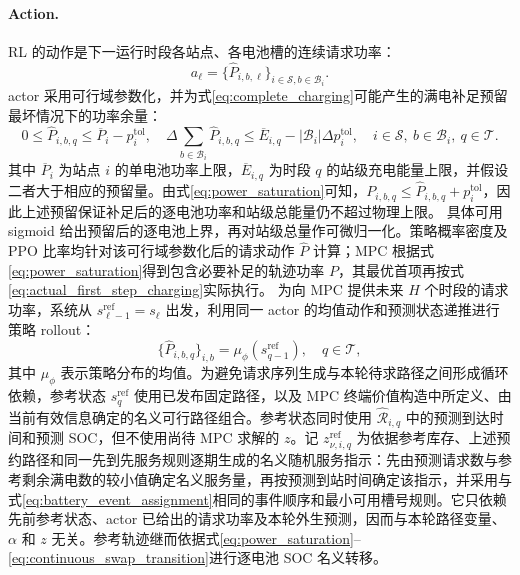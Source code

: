 \documentclass[12pt,a4paper,UTF8]{ctexart}
\begin{document}
\paragraph{Action.}
RL 的动作是下一运行时段各站点、各电池槽的连续请求功率：
\begin{equation}
a_\ell=
\{\widehat P_{i,b,\ell}\}_{i\in\mathcal S,b\in\mathcal B_i}.
\label{eq:rl_action}
\end{equation}
actor 采用可行域参数化，并为式\eqref{eq:complete_charging}可能产生的满电补足预留最坏情况下的功率余量：
\begin{equation}
0\le\widehat P_{i,b,q}\le\overline P_i-p_i^{\mathrm{tol}},
\quad
\Delta\sum_{b\in\mathcal B_i}\widehat P_{i,b,q}
\le\overline E_{i,q}-|\mathcal B_i|\Delta p_i^{\mathrm{tol}},
\quad i\in\mathcal S,\ b\in\mathcal B_i,\ q\in\mathcal T.
\label{eq:rl_action_projection}
\end{equation}
其中 $\overline P_i$ 为站点 $i$ 的单电池功率上限，$\overline E_{i,q}$ 为时段 $q$ 的站级充电能量上限，并假设二者大于相应的预留量。由式\eqref{eq:power_saturation}可知，$P_{i,b,q}\le\widehat P_{i,b,q}+p_i^{\mathrm{tol}}$，因此上述预留保证补足后的逐电池功率和站级总能量仍不超过物理上限。
具体可用 sigmoid 给出预留后的逐电池上界，再对站级总量作可微归一化。策略概率密度及 PPO 比率均针对该可行域参数化后的请求动作 $\widehat P$ 计算；MPC 根据式\eqref{eq:power_saturation}得到包含必要补足的轨迹功率 $P$，其最优首项再按式\eqref{eq:actual_first_step_charging}实际执行。
为向 MPC 提供未来 $H$ 个时段的请求功率，系统从
$s_{\ell-1}^{\mathrm{ref}}=s_\ell$ 出发，利用同一 actor 的均值动作和预测状态递推进行策略 rollout：
\begin{equation}
\{\widehat P_{i,b,q}\}_{i,b}
=
\mu_\phi(s_{q-1}^{\mathrm{ref}}),
\quad q\in\mathcal T,
\label{eq:rl_power_rollout}
\end{equation}
其中 $\mu_\phi$ 表示策略分布的均值。为避免请求序列生成与本轮待求路径之间形成循环依赖，参考状态 $s_{q}^{\mathrm{ref}}$ 使用已发布固定路径，以及 MPC 终端价值构造中所定义、由当前有效信息确定的名义可行路径组合。参考状态同时使用 $\widehat{\mathcal R}_{i,q}$ 中的预测到达时间和预测 SOC，但不使用尚待 MPC 求解的 $z$。记 $z_{\nu,i,q}^{\mathrm{ref}}$ 为依据参考库存、上述预约路径和同一先到先服务规则逐期生成的名义随机服务指示：先由预测请求数与参考剩余满电数的较小值确定名义服务量，再按预测到站时间确定该指示，并采用与式\eqref{eq:battery_event_assignment}相同的事件顺序和最小可用槽号规则。它只依赖先前参考状态、actor 已给出的请求功率及本轮外生预测，因而与本轮路径变量、$\alpha$ 和 $z$ 无关。参考轨迹继而依据式\eqref{eq:power_saturation}--\eqref{eq:continuous_swap_transition}进行逐电池 SOC 名义转移。
\end{document}
